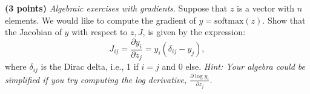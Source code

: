 \noindent {} 
\textbf{(3 points)} \textit{Algebraic exercises with gradients}. Suppose that $z$ is a vector with $n$ elements. We would like to compute the gradient of $y = \textrm{softmax}(z)$. Show that the Jacobian of $y$ with respect to $z, J$, is given by the expression:
\[
    J_{ij} = \frac{\partial y_i}{\partial z_j} = y_i (\delta_{ij} - y_j),
\]
where $\delta_{ij}$ is the Dirac delta, i.e., 1 if $i = j$ and 0 else. \textit{Hint: Your algebra could be simplified if you try computing the log derivative, $\frac{\partial \log y_i}{\partial z_j}$.}

\noindent \myAnswer{
}
